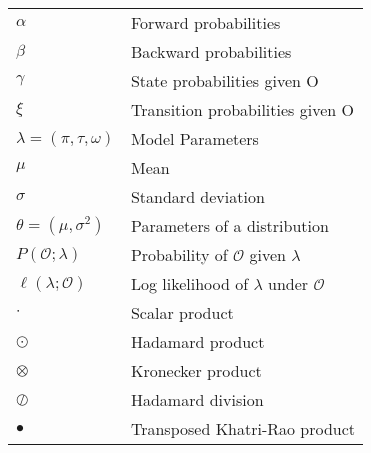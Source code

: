 \begin{table}[htb!]
\begin{tabular}{ll}
        $\alpha$                        & Forward probabilities                           \\
        $\beta$                         & Backward probabilities                          \\
        $\gamma$                        & State probabilities given O                     \\
        $\xi$                           & Transition probabilities given O                \\
        $\lambda = (\pi, \tau, \omega)$ & Model Parameters                                \\
        $\mu$                           & Mean                                            \\
        $\sigma$                        & Standard deviation                              \\
        $\theta = (\mu, \sigma^2)$      & Parameters of a distribution                    \\
        $P(\mathcal{O}; \lambda)$       & Probability of $\mathcal{O}$ given $\lambda$    \\
        $\ell(\lambda ;\mathcal{O})$    & Log likelihood of $\lambda$ under $\mathcal{O}$ \\
        $\cdot$                         & Scalar product                                  \\
        $\odot$                         & Hadamard product                                \\
        $\otimes$                       & Kronecker product                               \\
        $\oslash$                       & Hadamard division                               \\
        $\smblkcircle$                  & Transposed Khatri-Rao product                   \\
        \bottomrule
    \end{tabular}
    \label{tab:symbol-table}
\end{table}
